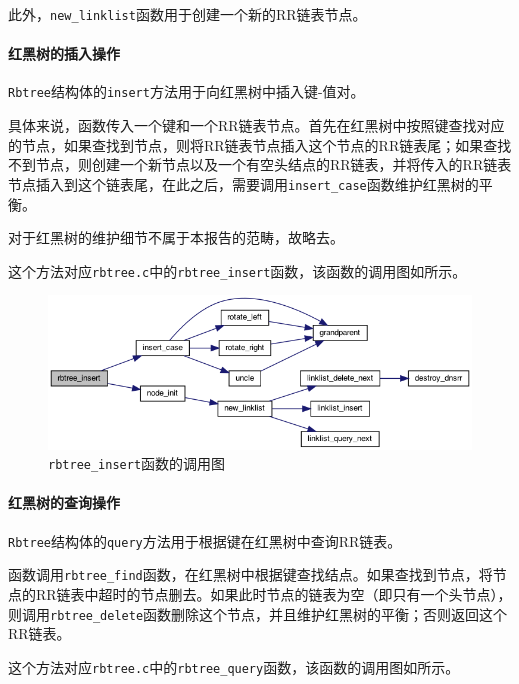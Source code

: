 \documentclass[lang=cn,11pt,a4paper,cite=authornum]{paper}
\begin{document}
此外，\texttt{new_linklist}函数用于创建一个新的RR链表节点。

\paragraph{红黑树的插入操作}

\texttt{Rbtree}结构体的\texttt{insert}方法用于向红黑树中插入键-值对。

具体来说，函数传入一个键和一个RR链表节点。首先在红黑树中按照键查找对应的节点，如果查找到节点，则将RR链表节点插入这个节点的RR链表尾；如果查找不到节点，则创建一个新节点以及一个有空头结点的RR链表，并将传入的RR链表节点插入到这个链表尾，在此之后，需要调用\texttt{insert_case}函数维护红黑树的平衡。

对于红黑树的维护细节不属于本报告的范畴，故略去。

这个方法对应\texttt{rbtree.c}中的\texttt{rbtree_insert}函数，该函数的调用图如所示。

\begin{figure}[htbp]

    \centering
    \includegraphics[width=0.8\linewidth]{./APIdoc/rbtree_8c_ae46c23eec5c1ea21ebab9279843de3a3_cgraph.png}
    \caption{\texttt{rbtree_insert}函数的调用图\label{fig:rbtree_insert_call}}

\end{figure}

\paragraph{红黑树的查询操作}

\texttt{Rbtree}结构体的\texttt{query}方法用于根据键在红黑树中查询RR链表。

函数调用\texttt{rbtree_find}函数，在红黑树中根据键查找结点。如果查找到节点，将节点的RR链表中超时的节点删去。如果此时节点的链表为空（即只有一个头节点），则调用\texttt{rbtree_delete}函数删除这个节点，并且维护红黑树的平衡；否则返回这个RR链表。

这个方法对应\texttt{rbtree.c}中的\texttt{rbtree_query}函数，该函数的调用图如所示。
\end{document}
